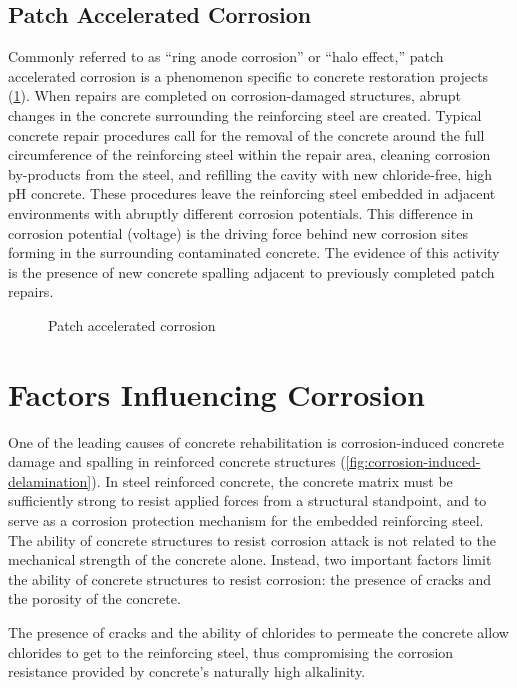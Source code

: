 \subsection{Patch Accelerated Corrosion}
Commonly referred to as “ring anode corrosion” or “halo effect,” patch accelerated corrosion is a phenomenon specific to concrete restoration projects (\cref{fig:patch-accelerated-corrosion}). When repairs are completed on corrosion-damaged structures, abrupt changes in the concrete surrounding the reinforcing steel are created. Typical concrete repair procedures call for the removal of the concrete around the full circumference of the reinforcing steel within the repair area, cleaning corrosion by-products from the steel, and refilling the cavity with new chloride-free, high pH concrete. These procedures leave the reinforcing steel embedded in adjacent environments with abruptly different corrosion potentials. This difference in corrosion potential (voltage) is the driving force behind new corrosion sites forming in the surrounding contaminated concrete. The evidence of this activity is the presence of new concrete spalling adjacent to previously completed patch repairs.

\begin{figure}
  \caption{Patch accelerated corrosion}
  \label{fig:patch-accelerated-corrosion}
\end{figure}


\section{Factors Influencing Corrosion}
\label{sec:factor-influencing-corrosion}
One of the leading causes of concrete rehabilitation is corrosion-induced concrete damage and spalling in reinforced concrete structures (\cref{fig:corrosion-induced-delamination}). In steel reinforced concrete, the concrete matrix must be sufficiently strong to resist applied forces from a structural standpoint, and to serve as a corrosion protection mechanism for the embedded reinforcing steel. The ability of concrete structures to resist corrosion attack is not related to the mechanical strength of the concrete alone. Instead, two important factors limit the ability of concrete structures to resist corrosion: the presence of cracks and the porosity of the concrete.

The presence of cracks and the ability of chlorides to permeate the concrete allow chlorides to get to the reinforcing steel, thus compromising the corrosion resistance provided by concrete’s naturally high alkalinity.


